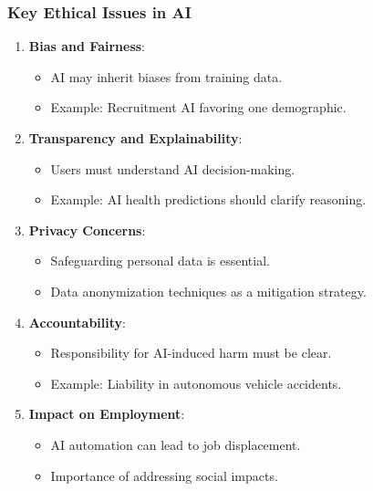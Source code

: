 \documentclass{beamer}
\begin{document}
\begin{frame}[fragile]
    \frametitle{Key Ethical Issues in AI}
    \begin{enumerate}
        \item \textbf{Bias and Fairness}: 
        \begin{itemize}
            \item AI may inherit biases from training data.
            \item Example: Recruitment AI favoring one demographic.
        \end{itemize}

        \item \textbf{Transparency and Explainability}:
        \begin{itemize}
            \item Users must understand AI decision-making.
            \item Example: AI health predictions should clarify reasoning.
        \end{itemize}
        
        \item \textbf{Privacy Concerns}:
        \begin{itemize}
            \item Safeguarding personal data is essential.
            \item Data anonymization techniques as a mitigation strategy.
        \end{itemize}

        \item \textbf{Accountability}:
        \begin{itemize}
            \item Responsibility for AI-induced harm must be clear.
            \item Example: Liability in autonomous vehicle accidents.
        \end{itemize}

        \item \textbf{Impact on Employment}:
        \begin{itemize}
            \item AI automation can lead to job displacement.
            \item Importance of addressing social impacts.
        \end{itemize}
    \end{enumerate}
\end{frame}
\end{document}
